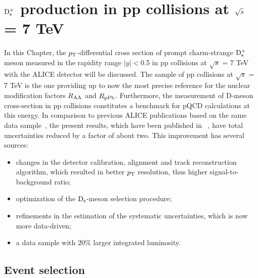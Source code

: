 \chapter{${\rm D_s^+}$ production in pp collisions at $\sqrt{s}$ = 7 TeV}
\label{chap:pp}
In this Chapter, the $p_{\rm T}$-differential cross section of prompt charm-strange ${\rm D_s^+}$ meson 
measured in the rapidity range $|y| < $0.5 in pp collisions at 
$\sqrt{s}$ = 7 TeV with the ALICE detector will be discussed.
The sample of pp collisions at $\sqrt{s}$ = 7 TeV is the one providing up to now the most precise reference for
the nuclear modification factors $R_{\rm AA}$ and $R_{\rm pPb}$. 
Furthermore, the measurement of D-meson cross-section in pp collisions 
constitutes a benchmark for pQCD calculations
at this energy.
In comparison to previous ALICE publications based on the same data 
sample~\cite{ALICE:2011aa,Abelev:2012tca,Adam:2016ich}, the present 
results, which have been published in ~\cite{Acharya:2017jgo}, have total uncertainties reduced by a factor of about two. This improvement 
has several sources: 
\begin{itemize}
\item changes in the detector calibration, alignment and track reconstruction 
algorithm, which resulted in better $p_{\rm T}$ resolution, thus higher signal-to-background ratio; 
\item optimization of the ${\rm D_s}$-meson selection procedure; 
\item refinements in the estimation of the systematic uncertainties, which is now more data-driven;
\item a data sample with 20\% larger integrated luminosity.
\end{itemize} 

\section{Event selection}
\label{sec:EvSelec}


